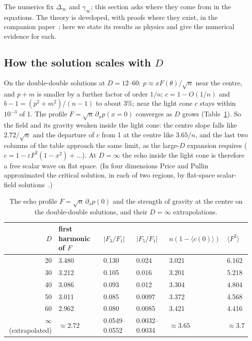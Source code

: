 \documentclass[aps,prd,onecolumn,superscriptaddress,nofootinbib,10pt]{revtex4-2}
\newcommand{\Dinf}{\Delta_\infty}
\newcommand{\eps}{\varepsilon}
\begin{document}
The numerics fix $\Dinf$ and $\gamma_\infty$; this section asks where they come from in the equations. The theory is
developed, with proofs where they exist, in the companion paper~\cite{math}; here we state its results as physics and
give the numerical evidence for each.

\subsection{How the solution scales with $D$}
\label{sec:scaling}

On the double-double solutions at $D = 12$--$60$: $p \approx x F(\theta)/\sqrt n$ near the centre, and $p + m$ is
smaller by a further factor of order $1/n$; $c = 1 - O(1/n)$ and $b - 1 = (p^2+m^2)/(n-1)$ to about 3\%; near the light
cone $c$ stays within $10^{-3}$ of 1. The profile $F = \sqrt n\,\partial_x p(x = 0)$ converges as $D$ grows
(Table~\ref{tab:scaling}). So the field and its gravity weaken inside the light cone: the centre slope falls like
$2.72/\sqrt n$ and the departure of $c$ from 1 at the centre like $3.65/n$, and the last two columns of the table
approach the same limit, as the large-$D$ expansion requires ($c = 1 - \eps F^2(1-x^2) + \dots$). At $D = \infty$ the
echo inside the light cone is therefore a free scalar wave on flat space. (In four dimensions Price and Pullin approximated
the critical solution, in each of two regions, by flat-space scalar-field solutions~\cite{PricePullin1996}.)

\begin{table}[htbp]
\caption{The echo profile $F = \sqrt n\,\partial_x p(0)$ and the strength of gravity at the centre on the double-double
solutions, and their $D = \infty$ extrapolations.}
\label{tab:scaling}
\small
\begin{ruledtabular}
\begin{tabular}{rlllll}
$D$ & first harmonic of $F$ & $|F_3/F_1|$ & $|F_5/F_1|$ & $n(1 - \langle c(0)\rangle)$ & $\langle F^2\rangle$ \\ \hline
20 & 3.480 & 0.130 & 0.024 & 3.021 & 6.162 \\
30 & 3.212 & 0.105 & 0.016 & 3.201 & 5.218 \\
40 & 3.086 & 0.093 & 0.012 & 3.304 & 4.804 \\
50 & 3.011 & 0.085 & 0.0097 & 3.372 & 4.568 \\
60 & 2.962 & 0.080 & 0.0085 & 3.421 & 4.416 \\
$\infty$ (extrapolated) & $\approx 2.72$ & 0.0549--0.0552 & 0.0032--0.0034 & $\approx 3.65$ & $\approx 3.7$ \\
\end{tabular}
\end{ruledtabular}
\end{table}
\end{document}
